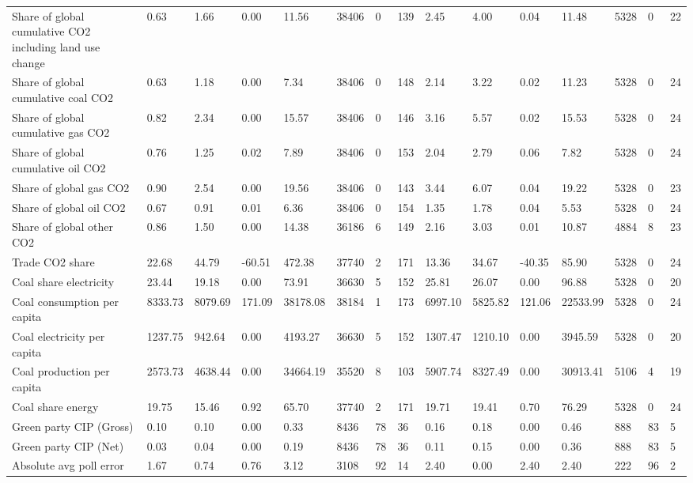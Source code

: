 \begin{longtable}{lllllllllllllll}
Share of global cumulative CO2 including land use change & 0.63 & 1.66 & 0.00 & 11.56 & 38406 & 0 & 139 & 2.45 & 4.00 & 0.04 & 11.48 & 5328 & 0 & 22\\
Share of global cumulative coal CO2 & 0.63 & 1.18 & 0.00 & 7.34 & 38406 & 0 & 148 & 2.14 & 3.22 & 0.02 & 11.23 & 5328 & 0 & 24\\
Share of global cumulative gas CO2 & 0.82 & 2.34 & 0.00 & 15.57 & 38406 & 0 & 146 & 3.16 & 5.57 & 0.02 & 15.53 & 5328 & 0 & 24\\
Share of global cumulative oil CO2 & 0.76 & 1.25 & 0.02 & 7.89 & 38406 & 0 & 153 & 2.04 & 2.79 & 0.06 & 7.82 & 5328 & 0 & 24\\
\addlinespace
Share of global gas CO2 & 0.90 & 2.54 & 0.00 & 19.56 & 38406 & 0 & 143 & 3.44 & 6.07 & 0.04 & 19.22 & 5328 & 0 & 23\\
Share of global oil CO2 & 0.67 & 0.91 & 0.01 & 6.36 & 38406 & 0 & 154 & 1.35 & 1.78 & 0.04 & 5.53 & 5328 & 0 & 24\\
Share of global other CO2 & 0.86 & 1.50 & 0.00 & 14.38 & 36186 & 6 & 149 & 2.16 & 3.03 & 0.01 & 10.87 & 4884 & 8 & 23\\
Trade CO2 share & 22.68 & 44.79 & -60.51 & 472.38 & 37740 & 2 & 171 & 13.36 & 34.67 & -40.35 & 85.90 & 5328 & 0 & 24\\
Coal share electricity & 23.44 & 19.18 & 0.00 & 73.91 & 36630 & 5 & 152 & 25.81 & 26.07 & 0.00 & 96.88 & 5328 & 0 & 20\\
\addlinespace
Coal consumption per capita & 8333.73 & 8079.69 & 171.09 & 38178.08 & 38184 & 1 & 173 & 6997.10 & 5825.82 & 121.06 & 22533.99 & 5328 & 0 & 24\\
Coal electricity per capita & 1237.75 & 942.64 & 0.00 & 4193.27 & 36630 & 5 & 152 & 1307.47 & 1210.10 & 0.00 & 3945.59 & 5328 & 0 & 20\\
Coal production per capita & 2573.73 & 4638.44 & 0.00 & 34664.19 & 35520 & 8 & 103 & 5907.74 & 8327.49 & 0.00 & 30913.41 & 5106 & 4 & 19\\
Coal share energy & 19.75 & 15.46 & 0.92 & 65.70 & 37740 & 2 & 171 & 19.71 & 19.41 & 0.70 & 76.29 & 5328 & 0 & 24\\
Green party CIP (Gross) & 0.10 & 0.10 & 0.00 & 0.33 & 8436 & 78 & 36 & 0.16 & 0.18 & 0.00 & 0.46 & 888 & 83 & 5\\
\addlinespace
Green party CIP (Net) & 0.03 & 0.04 & 0.00 & 0.19 & 8436 & 78 & 36 & 0.11 & 0.15 & 0.00 & 0.36 & 888 & 83 & 5\\
Absolute avg poll error & 1.67 & 0.74 & 0.76 & 3.12 & 3108 & 92 & 14 & 2.40 & 0.00 & 2.40 & 2.40 & 222 & 96 & 2\\

\end{longtable}
